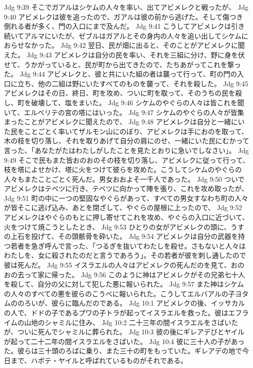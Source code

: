Jdg 9:39  そこでガアルはシケムの人々を率い、出てアビメレクと戦ったが、
Jdg 9:40  アビメレクは彼を追ったので、ガアルは彼の前から逃げた。そして傷つき倒れる者が多く、門の入口にまで及んだ。
Jdg 9:41  こうしてアビメレクは引き続いてアルマにいたが、ゼブルはガアルとその身内の人々を追い出してシケムにおらせなかった。
Jdg 9:42  翌日、民が畑に出ると、そのことがアビメレクに聞えた。
Jdg 9:43  アビメレクは自分の民を率い、それを三組に分け、野に身を伏せて、うかがっていると、民が町から出てきたので、たちあがってこれを撃った。
Jdg 9:44  アビメレクと、彼と共にいた組の者は襲って行って、町の門の入口に立ち、他の二組は野にいたすべてのものを襲って、それを殺した。
Jdg 9:45  アビメレクはその日、終日、町を攻め、ついに町を取って、そのうちの民を殺し、町を破壊して、塩をまいた。
Jdg 9:46  シケムのやぐらの人々は皆これを聞いて、エルベリテの宮の塔にはいった。
Jdg 9:47  シケムのやぐらの人々が皆集まったことがアビメレクに聞えたので、
Jdg 9:48  アビメレクは自分と一緒にいた民をことごとく率いてザルモン山にのぼり、アビメレクは手におのを取って、木の枝を切り落し、それを取りあげて自分の肩にのせ、一緒にいた民にむかって言った、「あなたがたはわたしがしたことを見たとおりに急いでしなさい」。
Jdg 9:49  そこで民もまた皆おのおのその枝を切り落し、アビメレクに従って行って、枝を塔によせかけ、塔に火をつけて彼らを攻めた。こうしてシケムのやぐらの人々もまたことごとく死んだ。男女おおよそ一千人であった。
Jdg 9:50  ついでアビメレクはテベツに行き、テベツに向かって陣を張り、これを攻め取ったが、
Jdg 9:51  町の中に一つの堅固なやぐらがあって、すべての男女すなわち町の人々が皆そこに逃げ込み、あとを閉ざして、やぐらの屋根に上ったので、
Jdg 9:52  アビメレクはやぐらのもとに押し寄せてこれを攻め、やぐらの入口に近づいて、火をつけて焼こうとしたとき、
Jdg 9:53  ひとりの女がアビメレクの頭に、うすの上石を投げて、その頭骸骨を砕いた。
Jdg 9:54  アビメレクは自分の武器を持つ若者を急ぎ呼んで言った、「つるぎを抜いてわたしを殺せ。さもないと人々はわたしを、女に殺されたのだと言うであろう」。その若者が彼を刺し通したので彼は死んだ。
Jdg 9:55  イスラエルの人々はアビメレクの死んだのを見て、おのおの去って家に帰った。
Jdg 9:56  このように神はアビメレクがその兄弟七十人を殺して、自分の父に対して犯した悪に報いられた。
Jdg 9:57  また神はシケムの人々のすべての悪を彼らのこうべに報いられた。こうしてエルバアルの子ヨタムののろいが、彼らに臨んだのである。
Jdg 10:1  アビメレクの後、イッサカルの人で、ドドの子であるプワの子トラが起ってイスラエルを救った。彼はエフライムの山地のシャミルに住み、
Jdg 10:2  二十三年の間イスラエルをさばいたが、ついに死んでシャミルに葬られた。
Jdg 10:3  彼の後にギレアデびとヤイルが起って二十二年の間イスラエルをさばいた。
Jdg 10:4  彼に三十人の子があった。彼らは三十頭のろばに乗り、また三十の町をもっていた。ギレアデの地で今日まで、ハボテ・ヤイルと呼ばれているものがそれである。
